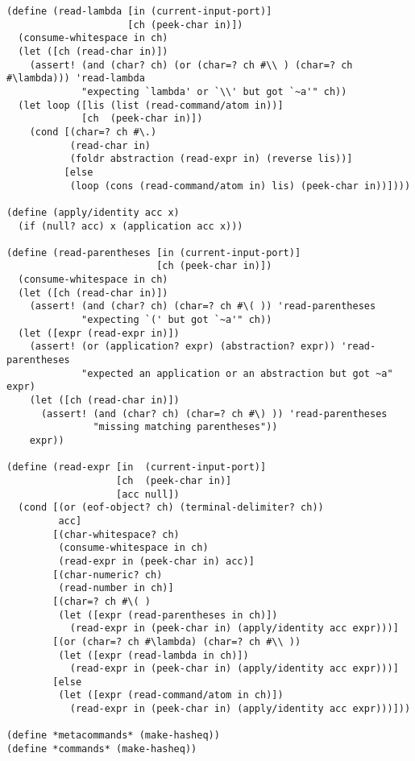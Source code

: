\begin{lstlisting}[language=racket]
(define (read-lambda [in (current-input-port)]
                     [ch (peek-char in)])
  (consume-whitespace in ch)
  (let ([ch (read-char in)])
    (assert! (and (char? ch) (or (char=? ch #\\ ) (char=? ch #\lambda))) 'read-lambda
             "expecting `lambda' or `\\' but got `~a'" ch))
  (let loop ([lis (list (read-command/atom in))]
             [ch  (peek-char in)])
    (cond [(char=? ch #\.)
           (read-char in)
           (foldr abstraction (read-expr in) (reverse lis))]
          [else
           (loop (cons (read-command/atom in) lis) (peek-char in))])))

(define (apply/identity acc x)
  (if (null? acc) x (application acc x)))

(define (read-parentheses [in (current-input-port)]
                          [ch (peek-char in)])
  (consume-whitespace in ch)
  (let ([ch (read-char in)])
    (assert! (and (char? ch) (char=? ch #\( )) 'read-parentheses
             "expecting `(' but got `~a'" ch))
  (let ([expr (read-expr in)])
    (assert! (or (application? expr) (abstraction? expr)) 'read-parentheses
             "expected an application or an abstraction but got ~a" expr)
    (let ([ch (read-char in)])
      (assert! (and (char? ch) (char=? ch #\) )) 'read-parentheses
               "missing matching parentheses"))
    expr))

(define (read-expr [in  (current-input-port)]
                   [ch  (peek-char in)]
                   [acc null])
  (cond [(or (eof-object? ch) (terminal-delimiter? ch))
         acc]
        [(char-whitespace? ch)
         (consume-whitespace in ch)
         (read-expr in (peek-char in) acc)]
        [(char-numeric? ch)
         (read-number in ch)]
        [(char=? ch #\( )
         (let ([expr (read-parentheses in ch)])
           (read-expr in (peek-char in) (apply/identity acc expr)))]
        [(or (char=? ch #\lambda) (char=? ch #\\ ))
         (let ([expr (read-lambda in ch)])
           (read-expr in (peek-char in) (apply/identity acc expr)))]
        [else
         (let ([expr (read-command/atom in ch)])
           (read-expr in (peek-char in) (apply/identity acc expr)))]))

(define *metacommands* (make-hasheq))
(define *commands* (make-hasheq))


\end{lstlisting}
